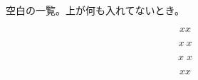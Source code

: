 \documentclass[b5j,10pt,twoside,autodetect-engine,dvipdfmx,fleqn]{jsarticle}
\begin{document}
空白の一覧。上が何も入れてないとき。

\[ x  x \]

\[ x \> x \]

\[ x \; x \]

\[ x \! x \]
\end{document}
